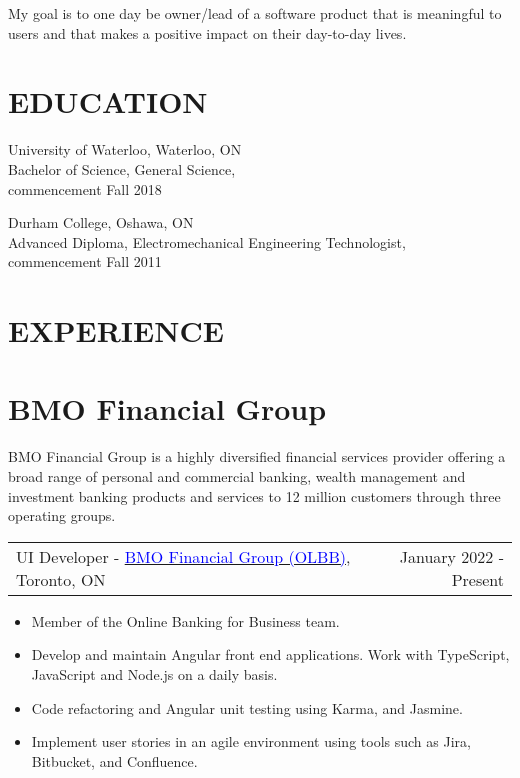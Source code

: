 \documentclass[margin]{res}
\begin{document}
\begin{resume}
	My goal is to one day be owner/lead of a software product that is meaningful to users
	and that makes a positive impact on their day-to-day lives.

	\section{\textcolor{NavyBlue}{EDUCATION}}

	University of Waterloo, Waterloo, ON \\
	Bachelor of Science, General Science, \\
	commencement Fall 2018

	Durham College, Oshawa, ON \\
	Advanced Diploma, Electromechanical Engineering Technologist, \\
	commencement Fall 2011


	\section{\textcolor{NavyBlue}{EXPERIENCE}}

	\normalsize{\section{BMO Financial Group}}

	BMO Financial Group is a highly diversified financial services provider offering
	a broad range of personal and commercial banking, wealth management and investment
	banking products and services to 12 million customers through three operating groups.

	\begin{tabular}{p{3in} r} %
		UI Developer - \href{https://bmo.com}{\textcolor{blue}{BMO Financial Group (OLBB)}}, Toronto, ON & January 2022 - Present
	\end{tabular}

	\begin{itemize} %
		\item Member of the Online Banking for Business team.
		\item Develop and maintain Angular front end applications. Work with TypeScript, JavaScript and Node.js on a daily basis.
		\item Code refactoring and Angular unit testing using Karma, and Jasmine.
		\item Implement user stories in an agile environment using tools such as Jira, Bitbucket, and Confluence.
	\end{itemize}


\end{resume}
\end{document}
